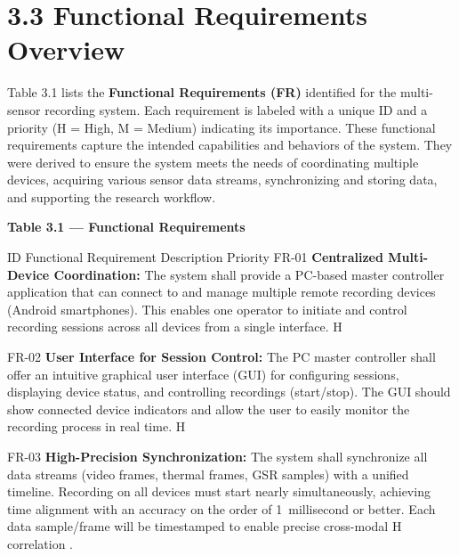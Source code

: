 \documentclass[11pt,a4paper]{report}
\begin{document}
\section{3.3 Functional Requirements Overview}

Table 3.1 lists the \textbf{Functional Requirements (FR)} identified for the
multi-sensor recording system. Each requirement is labeled with a unique
ID and a priority (H = High, M = Medium) indicating its importance.
These functional requirements capture the intended capabilities and
behaviors of the system. They were derived to ensure the system meets
the needs of coordinating multiple devices, acquiring various sensor
data streams, synchronizing and storing data, and supporting the
research workflow.

\textbf{Table 3.1 --- Functional Requirements}

  ID                      Functional Requirement Description                                                                                                                                                                                                                                                                                                                                                 Priority
  FR-01                   \textbf{Centralized Multi-Device Coordination:} The system shall provide a PC-based master controller application that can connect to and manage multiple remote recording devices (Android smartphones). This enables one operator to initiate and control recording sessions across all devices from a single interface.                                                              H

  FR-02                   \textbf{User Interface for Session Control:} The PC master controller shall offer an intuitive graphical user interface (GUI) for configuring sessions, displaying device status, and controlling recordings (start/stop). The GUI should show connected device indicators and allow the user to easily monitor the recording process in real time.                                     H

  FR-03                   \textbf{High-Precision Synchronization:} The system shall synchronize all data streams (video frames, thermal frames, GSR samples) with a unified timeline. Recording on all devices must start nearly simultaneously, achieving time alignment with an accuracy on the order of 1 millisecond or better. Each data sample/frame will be timestamped to enable precise cross-modal      H
                          correlation \cite{Boucsein2012}.                                                                                                                                                                                                                                  
\end{document}
